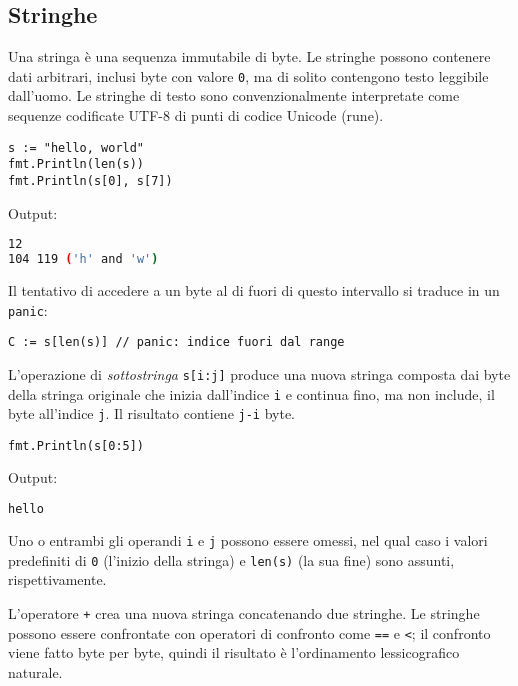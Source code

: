 \documentclass[../../thesis.tex]{subfiles}
\begin{document}
    \subsection{Stringhe}\label{subsec:stringhe}
    Una stringa è una sequenza immutabile di byte.
    Le stringhe possono contenere dati arbitrari, inclusi byte con valore \verb"0", ma di solito contengono testo leggibile dall'uomo.
    Le stringhe di testo sono convenzionalmente interpretate come sequenze codificate UTF-8 di punti di codice Unicode (rune).
    \begin{lstlisting}[frame = single,label={lst:lstlisting2.1}]
s := "hello, world"
fmt.Println(len(s))
fmt.Println(s[0], s[7])
    \end{lstlisting}
    Output:
    \begin{lstlisting}[language = bash, frame = L,label={lst:lstlisting2.2}]
12
104 119 ('h' and 'w')
    \end{lstlisting}
    Il tentativo di accedere a un byte al di fuori di questo intervallo si traduce in un \verb"panic":
    \begin{lstlisting}[frame = single,label={lst:lstlisting2.3}]
C := s[len(s)] // panic: indice fuori dal range
    \end{lstlisting}
    L'operazione di \textit{sottostringa} \verb"s[i:j]" produce una nuova stringa composta dai byte della stringa originale che inizia dall'indice \verb"i" e continua fino, ma non include, il byte all'indice \verb"j".
    Il risultato contiene \verb"j-i" byte.
    \begin{lstlisting}[frame = single,label={lst:lstlisting2.4}]
fmt.Println(s[0:5])
    \end{lstlisting}
    Output:
    \begin{lstlisting}[language = bash, frame = L,label={lst:lstlisting2-2.5}]
hello
    \end{lstlisting}
    Uno o entrambi gli operandi \verb"i" e \verb"j" possono essere omessi, nel qual caso i valori predefiniti di \verb"0" (l'inizio della stringa) e \verb"len(s)" (la sua fine) sono assunti, rispettivamente.
    \hfill \vspace{12pt}

    L'operatore \verb"+" crea una nuova stringa concatenando due stringhe.
    Le stringhe possono essere confrontate con operatori di confronto come \verb"==" e \verb"<"; il confronto viene fatto byte per byte, quindi il risultato è l'ordinamento lessicografico naturale.
    \hfill \vspace{12pt}
\end{document}
